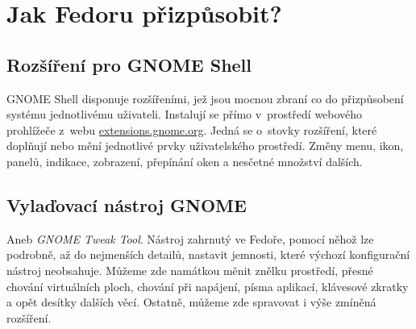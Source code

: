 \chapter*{Jak Fedoru přizpůsobit?}

\section*{Rozšíření pro GNOME Shell}
GNOME Shell disponuje rozšířeními, jež jsou mocnou zbraní co do přizpůsobení systému jednotlivému uživateli. Instalují se přímo v~prostředí webového prohlížeče z~webu \url{extensions.gnome.org}. Jedná se o~stovky rozšíření, které doplňují nebo mění jednotlivé prvky uživatelského prostředí. Změny menu, ikon, panelů, indikace, zobrazení, přepínání oken a nesčetné množství dalších.

\section*{Vylaďovací nástroj GNOME}
Aneb \emph{GNOME Tweak Tool}. Nástroj zahrnutý ve Fedoře, pomocí něhož lze podrobně, až do nejmenších detailů, nastavit jemnosti, které výchozí konfigurační nástroj neobsahuje. Můžeme zde namátkou měnit znělku prostředí, přesné chování virtuálních ploch, chování při napájení, písma aplikací, klávesové zkratky a opět desítky dalších věcí. Ostatně, můžeme zde spravovat i výše zmíněná rozšíření.

